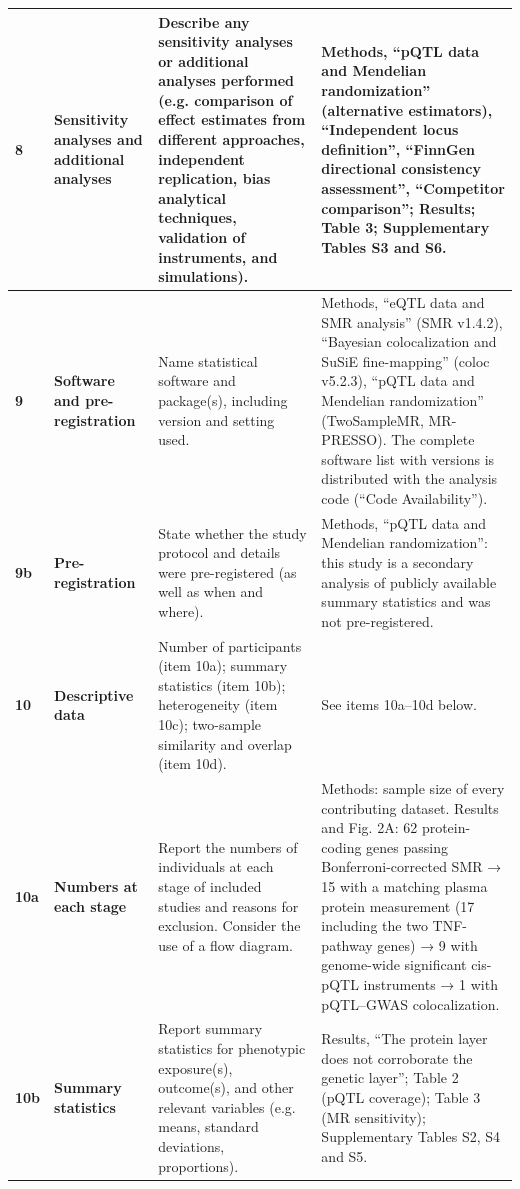 \documentclass[10pt,a4paper]{article}
\begin{document}
\begin{longtable}{@{}p{7mm}p{32mm}p{52mm}p{68mm}@{}}
\midrule
\textbf{8} & \textbf{Sensitivity analyses and additional analyses} & Describe any sensitivity analyses or additional analyses performed (e.g. comparison of effect estimates from different approaches, independent replication, bias analytical techniques, validation of instruments, and simulations). & Methods, ``pQTL data and Mendelian randomization'' (alternative estimators), ``Independent locus definition'', ``FinnGen directional consistency assessment'', ``Competitor comparison''; Results; Table 3; Supplementary Tables S3 and S6. \\
\midrule
\textbf{9} & \textbf{Software and pre-registration} & Name statistical software and package(s), including version and setting used. & Methods, ``eQTL data and SMR analysis'' (SMR v1.4.2), ``Bayesian colocalization and SuSiE fine-mapping'' (coloc v5.2.3), ``pQTL data and Mendelian randomization'' (TwoSampleMR, MR-PRESSO). The complete software list with versions is distributed with the analysis code (``Code Availability''). \\
\midrule
\textbf{9b} & \textbf{Pre-registration} & State whether the study protocol and details were pre-registered (as well as when and where). & Methods, ``pQTL data and Mendelian randomization'': this study is a secondary analysis of publicly available summary statistics and was not pre-registered. \\
\midrule
\textbf{10} & \textbf{Descriptive data} & Number of participants (item 10a); summary statistics (item 10b); heterogeneity (item 10c); two-sample similarity and overlap (item 10d). & See items 10a--10d below. \\
\midrule
\textbf{10a} & \textbf{Numbers at each stage} & Report the numbers of individuals at each stage of included studies and reasons for exclusion. Consider the use of a flow diagram. & Methods: sample size of every contributing dataset. Results and Fig. 2A: 62 protein-coding genes passing Bonferroni-corrected SMR → 15 with a matching plasma protein measurement (17 including the two TNF-pathway genes) → 9 with genome-wide significant cis-pQTL instruments → 1 with pQTL--GWAS colocalization. \\
\midrule
\textbf{10b} & \textbf{Summary statistics} & Report summary statistics for phenotypic exposure(s), outcome(s), and other relevant variables (e.g. means, standard deviations, proportions). & Results, ``The protein layer does not corroborate the genetic layer''; Table 2 (pQTL coverage); Table 3 (MR sensitivity); Supplementary Tables S2, S4 and S5. \\

\end{longtable}
\end{document}
